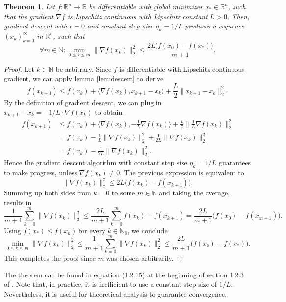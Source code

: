\documentclass[11pt, a4paper]{article}
\newtheorem{theorem}{Theorem}[section]
\newcommand{\N}{\mathbb{N}}
\newcommand{\R}{\mathbb{R}}
\begin{document}
\begin{theorem} \label{thm:descent}
Let $f: \R^n \to \R$ be differentiable with global minimizer $x_* \in \R^n$, such that the gradient $\nabla f$ is Lipschitz continuous with Lipschitz constant $L>0$. Then, gradient descent with $\epsilon = 0$ and constant step size $\eta_k = 1/L$ produces a sequence $(x_k)_{k=0}^\infty$ in $\R^n$, such that 
\[ \forall m \in \N : \min_{0 \leq k \leq m} \big \| \nabla f(x_k) \big \|_2^2 \leq \frac{2L \big ( f(x_0) - f(x_*) \big )}{m+1}. \]
\end{theorem}

\begin{proof}
Let $k \in \N$ be arbitrary. Since $f$ is differentiable with Lipschitz continuous gradient, we can apply lemma \ref{lem:descent} to derive
\[  f(x_{k+1}) \leq f(x_k) + \big \langle \nabla f(x_k) , x_{k+1} -x_k \big \rangle + \frac{L}{2} \big \| x_{k+1} - x_k \big \|_2^2. \]
By the definition of gradient descent, we can plug in $x_{k+1} - x_k = - 1/L \cdot \nabla f(x_k)$ to obtain
\[ \begin{split} 
f(x_{k+1}) 
&\leq f(x_k) + \big \langle \nabla f(x_k) , - \frac{1}{L} \nabla f(x_k) \big \rangle + \frac{L}{2} \big \| \frac{1}{L} \nabla f(x_k) \big \|_2^2 \\\
&= f(x_k) - \frac{1}{L} \big \| \nabla f(x_k) \big \|_2^2 + \frac{1}{2L} \big \| \nabla f(x_k) \big \|_2^2 \\\
&= f(x_k) - \frac{1}{2L} \big \| \nabla f(x_k) \big \|_2^2.
\end{split} \]
Hence the gradient descent algorithm with constant step size $\eta_k = 1/L$ guarantees to make progress, unless $\nabla f(x_k) \neq 0$. The previous expression is equivalent to
\[ \big \| \nabla f(x_k) \big \|_2^2 \leq 2L \big ( f(x_k) - f(x_{k+1}) \big ). \]
Summing up both sides from $k=0$ to some $m \in \N$ and taking the average, results in
\[ \frac{1}{m+1} \sum_{k=0}^{m} \big \| \nabla f(x_k) \big \|_2^2 \leq \frac{2L}{m+1} \sum_{k=0}^{m} f(x_k) - f(x_{k+1}) = \frac{2L}{m+1} \big ( f(x_0) - f(x_{m+1}) \big ). \]
Using $f(x_*) \leq f(x_k)$ for every $k \in \N_0$, we conclude
\[ \min_{0 \leq k \leq m} \big \| \nabla f(x_k) \big \|_2^2 \leq \frac{1}{m+1} \sum_{k=0}^{m} \big \| \nabla f(x_k) \big \|_2^2 \leq \frac{2L}{m+1} \big ( f(x_0) - f(x_*) \big ). \]
This completes the proof since $m$ was chosen arbitrarily.
\end{proof}

The theorem can be found in equation (1.2.15) at the beginning of section 1.2.3 of \cite{ConvexOptimization}. Note that, in practice, it is inefficient to use a constant step size of $1/L$. Nevertheless, it is useful for theoretical analysis to guarantee convergence. \\
\end{document}
